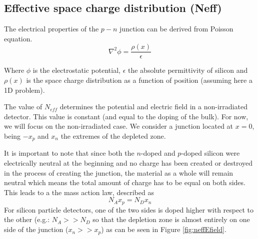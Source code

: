 \subsection{Effective space charge distribution (Neff)} 

The electrical properties of the $p-n$ junction can be derived from Poisson equation. 
\begin{equation}
\nabla^2 \phi = \frac{\rho(x)}{\epsilon} 
\label{eq:poisson}
\end{equation}

Where $\phi$ is the electrostatic potential, $\epsilon$ the absolute
permittivity of silicon and $\rho(x)$ is the space charge distribution as a
function of position (assuming here a 1D problem).

The value of $N_{eff}$ determines the potential and electric field in a
non-irradiated detector. This value is constant (and equal to the doping of the
bulk). For now, we will focus on the non-irradiated case. We consider a junction
located at $x=0$, being $-x_p$ and $x_n$ the extremes of the depleted zone.

It is important to note that since both the $n$-doped and $p$-doped silicon were
electrically neutral at the beginning and no charge has been created or
destroyed in the process of creating the junction, the material as a whole will
remain neutral which means the total amount of charge has to be equal on both
sides. This leads to a the mass action law, described as \[N_A x_p = N_D x_n\] 
For silicon particle detectors, one of the two sides is doped higher with
respect to the other (e.g.: $N_A >> N_D$  so that the depletion zone is almost
entirely on one side of the junction ($x_n >> x_p$) as can be seen in Figure \ref{fig:neffEfield}. 

